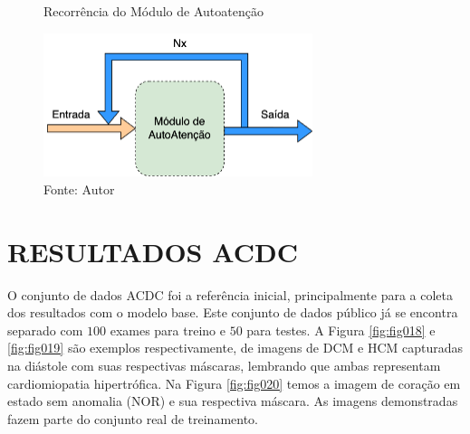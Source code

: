 \begin{figure}[H]
    \centering
    \caption{Recorrência do Módulo de Autoatenção}
    \includegraphics[width=0.7\textwidth]{figures/fig030.png}
    \caption*{Fonte: Autor}
    \label{fig:fig030}
\end{figure}







\section{RESULTADOS ACDC}
\label{sec:resultados_acdc}

O conjunto de dados \gls{ACDC} foi a referência inicial, principalmente para a coleta dos resultados com o modelo base. Este conjunto de dados público já se encontra separado com $100$ exames para treino e $50$ para testes. A Figura \ref{fig:fig018} e \ref{fig:fig019} são exemplos respectivamente, de imagens de \gls{DCM} e \gls{HCM} capturadas na diástole com suas respectivas máscaras, lembrando que ambas representam cardiomiopatia hipertrófica. Na Figura \ref{fig:fig020} temos a imagem de coração em estado sem anomalia (\gls{NOR}) e sua respectiva máscara. As imagens demonstradas fazem parte do conjunto real de treinamento.

